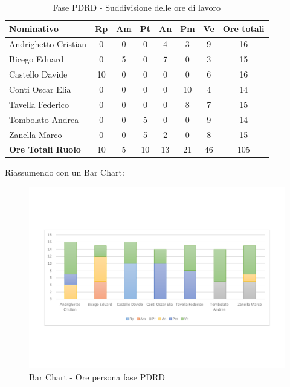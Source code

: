 \documentclass[../PianoProgetto.tex]{subfiles}
\begin{document}
	\begin{table}[h]
	
		\begin{tabularx}{\textwidth}{l  * {6}{C}  c}
			\toprule
			\textbf{Nominativo} & \textbf{Rp} & \textbf{Am} & \textbf{Pt} 
						& \textbf{An} & \textbf{Pm} & \textbf{Ve} & \textbf{Ore totali} \\
			\midrule
			Andrighetto Cristian & 0 & 0 & 0 & 4 & 3 & 9 & 16 \\
			Bicego Eduard & 0 & 5 &	0 &	7 &	0 &	3 &	15 \\
			Castello Davide & 10 & 0 & 0 & 0 & 0 & 6 & 16 \\
			Conti Oscar Elia & 0 & 0 & 0 & 0 & 10 &	4 &	14 \\
			Tavella Federico &	0 & 0 &	0 &	0 &	8 &	7 &	15 \\
			Tombolato Andrea & 0 & 0 & 5 & 0 & 0 & 9 & 14 \\
			Zanella Marco & 0 & 0 & 5 &	2 &	0 &	8 &	15 \\
			\midrule			
			\textbf{Ore Totali Ruolo} & 10 & 5 & 10 & 13 &	21 & 46 & 105 \\
			\bottomrule
		\end{tabularx}
		\caption{Fase PDRD - Suddivisione delle ore di lavoro}
		\label{tab:fasePDRD_ore}
	\end{table}
\vfill	
	Riassumendo con un Bar Chart:
	
	\begin{figure}[!h]
		\centering
		\includegraphics[width=\textwidth , trim=2cm 5cm 2cm 5cm]{grafici/PDRD/PDRD-ore-persona}
			\caption{Bar Chart - Ore persona fase PDRD}
		\label{fig:BarChart-fasePDRD_ore}
	\end{figure}
\vfill	
\newpage	
	
\end{document}
